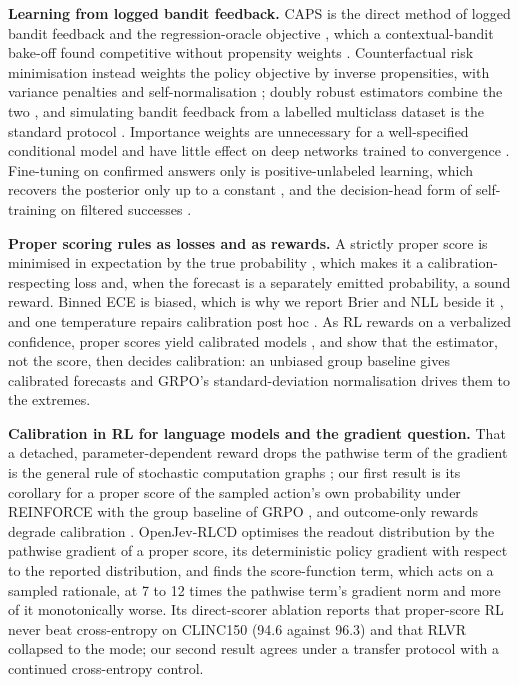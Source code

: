 \documentclass[10pt,letterpaper]{article}
\theoremstyle{plain}
\begin{document}
\textbf{Learning from logged bandit feedback.} CAPS is the direct method of logged bandit feedback \citep{dudik2011doubly} and the regression-oracle objective \citep{foster2018regcb,foster2020squarecb}, which a contextual-bandit bake-off found competitive without propensity weights \citep{bietti2021bakeoff}. Counterfactual risk minimisation instead weights the policy objective by inverse propensities, with variance penalties and self-normalisation \citep{swaminathan2015crm,swaminathan2015selfnormalized,joachims2018banditnet}; doubly robust estimators combine the two \citep{dudik2011doubly}, and simulating bandit feedback from a labelled multiclass dataset is the standard protocol \citep{beygelzimer2009offset}. Importance weights are unnecessary for a well-specified conditional model \citep{shimodaira2000covariate} and have little effect on deep networks trained to convergence \citep{byrd2019importance}. Fine-tuning on confirmed answers only is positive-unlabeled learning, which recovers the posterior only up to a constant \citep{elkan2008pu}, and the decision-head form of self-training on filtered successes \citep{zelikman2022star}.

\textbf{Proper scoring rules as losses and as rewards.} A strictly proper score is minimised in expectation by the true probability \citep{brier1950verification,gneiting2007proper}, which makes it a calibration-respecting loss and, when the forecast is a separately emitted probability, a sound reward. Binned ECE \citep{naeini2015ece} is biased, which is why we report Brier and NLL beside it \citep{nixon2019measuring}, and one temperature repairs calibration post hoc \citep{guo2017calibration}. As RL rewards on a verbalized confidence, proper scores yield calibrated models \citep{damani2025rlcr}, and \citet{bereket2025uncalibrated} show that the estimator, not the score, then decides calibration: an unbiased group baseline gives calibrated forecasts and GRPO's standard-deviation normalisation drives them to the extremes.

\textbf{Calibration in RL for language models and the gradient question.} That a detached, parameter-dependent reward drops the pathwise term of the gradient is the general rule of stochastic computation graphs \citep{schulman2015scg,mohamed2020montecarlo}; our first result is its corollary for a proper score of the sampled action's own probability under REINFORCE \citep{williams1992reinforce} with the group baseline of GRPO \citep{shao2024deepseekmath}, and outcome-only rewards degrade calibration \citep{damani2025rlcr}. OpenJev-RLCD \citep{gao2026openjev} optimises the readout distribution by the pathwise gradient of a proper score, its deterministic policy gradient with respect to the reported distribution, and finds the score-function term, which acts on a sampled rationale, at 7 to 12 times the pathwise term's gradient norm and more of it monotonically worse. Its direct-scorer ablation reports that proper-score RL never beat cross-entropy on CLINC150 (94.6 against 96.3) and that RLVR collapsed to the mode; our second result agrees under a transfer protocol with a continued cross-entropy control.
\end{document}
